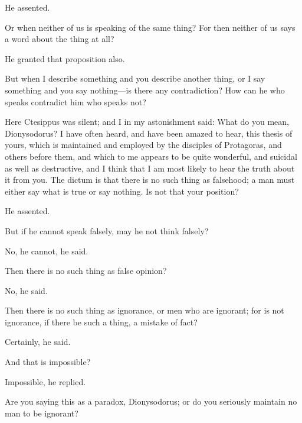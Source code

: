 \documentclass[11pt,letter]{article}
\begin{document}
\par  He assented.

\par  Or when neither of us is speaking of the same thing? For then neither of us says a word about the thing at all?

\par  He granted that proposition also.

\par  But when I describe something and you describe another thing, or I say something and you say nothing—is there any contradiction? How can he who speaks contradict him who speaks not?

\par  Here Ctesippus was silent; and I in my astonishment said: What do you mean, Dionysodorus? I have often heard, and have been amazed to hear, this thesis of yours, which is maintained and employed by the disciples of Protagoras, and others before them, and which to me appears to be quite wonderful, and suicidal as well as destructive, and I think that I am most likely to hear the truth about it from you. The dictum is that there is no such thing as falsehood; a man must either say what is true or say nothing. Is not that your position?

\par  He assented.

\par  But if he cannot speak falsely, may he not think falsely?

\par  No, he cannot, he said.

\par  Then there is no such thing as false opinion?

\par  No, he said.

\par  Then there is no such thing as ignorance, or men who are ignorant; for is not ignorance, if there be such a thing, a mistake of fact?

\par  Certainly, he said.

\par  And that is impossible?

\par  Impossible, he replied.

\par  Are you saying this as a paradox, Dionysodorus; or do you seriously maintain no man to be ignorant?
\end{document}
